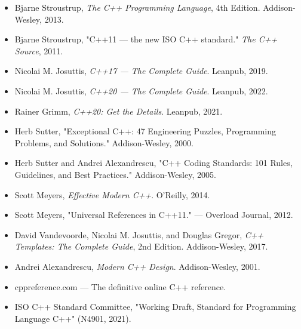 \begin{itemize}
\item Bjarne Stroustrup, \textit{The C++ Programming Language}, 4th Edition. Addison-Wesley, 2013.
\item Bjarne Stroustrup, "C++11 — the new ISO C++ standard." \textit{The C++ Source}, 2011.
\item Nicolai M. Josuttis, \textit{C++17 — The Complete Guide}. Leanpub, 2019.
\item Nicolai M. Josuttis, \textit{C++20 — The Complete Guide}. Leanpub, 2022.
\item Rainer Grimm, \textit{C++20: Get the Details}. Leanpub, 2021.
\item Herb Sutter, "Exceptional C++: 47 Engineering Puzzles, Programming Problems, and Solutions." Addison-Wesley, 2000.
\item Herb Sutter and Andrei Alexandrescu, "C++ Coding Standards: 101 Rules, Guidelines, and Best Practices." Addison-Wesley, 2005.
\item Scott Meyers, \textit{Effective Modern C++}. O'Reilly, 2014.
\item Scott Meyers, "Universal References in C++11." — Overload Journal, 2012.
\item David Vandevoorde, Nicolai M. Josuttis, and Douglas Gregor, \textit{C++ Templates: The Complete Guide}, 2nd Edition. Addison-Wesley, 2017.
\item Andrei Alexandrescu, \textit{Modern C++ Design}. Addison-Wesley, 2001.
\item cppreference.com — The definitive online C++ reference.
\item ISO C++ Standard Committee, "Working Draft, Standard for Programming Language C++" (N4901, 2021).
\end{itemize}

